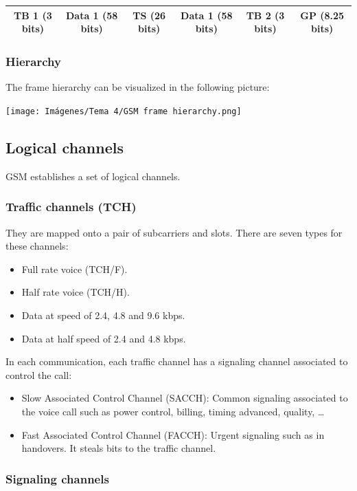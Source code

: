 \documentclass[
	12pt,
	twoside
]{book}
\begin{document}
\begin{tabular}{|c|c|c|c|c|c|}
	\hline
	TB 1 (3 bits)	& Data 1 (58 bits)	& TS (26 bits)	& Data 1 (58 bits)	& TB 2 (3 bits)	& GP (8.25 bits) \\
	\hline
\end{tabular}

\subsubsection{Hierarchy}

The frame hierarchy can be visualized in the following picture:

\texttt{[image: Imágenes/Tema 4/GSM frame hierarchy.png]}

\subsection{Logical channels}

GSM establishes a set of logical channels.

\subsubsection{Traffic channels (TCH)}

They are mapped onto a pair of subcarriers and slots. There are seven types for these channels:
\begin{itemize}
	\item Full rate voice (TCH/F).
	\item Half rate voice (TCH/H).
	\item Data at speed of 2.4, 4.8 and 9.6 kbps.
	\item Data at half speed of 2.4 and 4.8 kbps.
\end{itemize}

In each communication, each traffic channel has a signaling channel associated to control the call:
\begin{itemize}
	\item Slow Associated Control Channel (SACCH): Common signaling associated to the voice call such as power control, billing, timing advanced, quality, \ldots
	\item Fast Associated Control Channel (FACCH): Urgent signaling such as in handovers. It steals bits to the traffic channel.
\end{itemize}

\subsubsection{Signaling channels}
\end{document}
